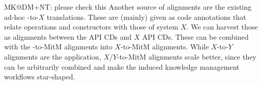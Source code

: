 \begin{newpart}{MK@DM+NT: please check this }
  Another source of alignments are the existing ad-hoc \Sage-to-$X$ translations. These
  are (mainly) given as \Sage code annotations that relate \Sage operations and
  constructors with those of system $X$. We can harvest those as alignments between
  the \Sage API CDs and $X$ API CDs. These can be combined with the \Sage-to-MitM
  alignments into $X$-to-MitM alignments. While $X$-to-$Y$ alignments are the application,
  $X$/$Y$-to-MitM alignments scale better, since they can be arbitrarily combined and make
  the induced knowledge management workflows star-shaped.
\end{newpart}



